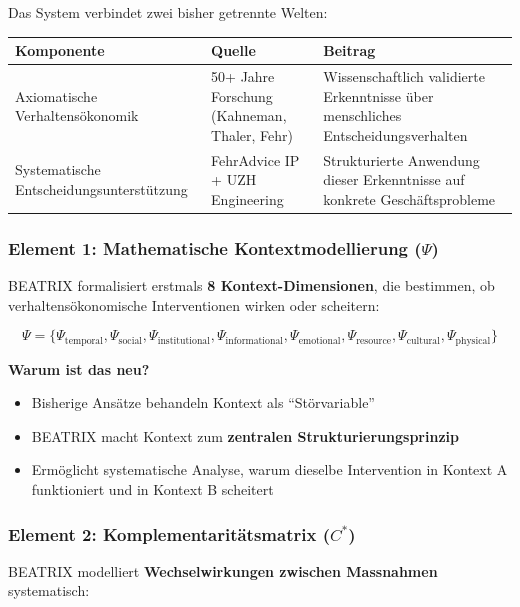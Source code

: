 \documentclass[11pt,a4paper]{article}
\begin{document}
Das System verbindet zwei bisher getrennte Welten:

\begin{table}[h]
\centering
\begin{tabularx}{\textwidth}{lXX}
\toprule
\textbf{Komponente} & \textbf{Quelle} & \textbf{Beitrag} \\
\midrule
Axiomatische Verhaltensökonomik & 50+ Jahre Forschung (Kahneman, Thaler, Fehr) & Wissenschaftlich validierte Erkenntnisse über menschliches Entscheidungsverhalten \\
Systematische Entscheidungsunterstützung & FehrAdvice IP + UZH Engineering & Strukturierte Anwendung dieser Erkenntnisse auf konkrete Geschäftsprobleme \\
\bottomrule
\end{tabularx}
\end{table}

\subsubsection{Element 1: Mathematische Kontextmodellierung ($\Psi$)}

BEATRIX formalisiert erstmals \textbf{8 Kontext-Dimensionen}, die bestimmen, ob verhaltensökonomische Interventionen wirken oder scheitern:

\begin{equation}
\Psi = \{\Psi_{\text{temporal}}, \Psi_{\text{social}}, \Psi_{\text{institutional}}, \Psi_{\text{informational}}, \Psi_{\text{emotional}}, \Psi_{\text{resource}}, \Psi_{\text{cultural}}, \Psi_{\text{physical}}\}
\end{equation}

\textbf{Warum ist das neu?}
\begin{itemize}
    \item Bisherige Ansätze behandeln Kontext als ``Störvariable''
    \item BEATRIX macht Kontext zum \textbf{zentralen Strukturierungsprinzip}
    \item Ermöglicht systematische Analyse, warum dieselbe Intervention in Kontext A funktioniert und in Kontext B scheitert
\end{itemize}

\subsubsection{Element 2: Komplementaritätsmatrix ($C^*$)}

BEATRIX modelliert \textbf{Wechselwirkungen zwischen Massnahmen} systematisch:
\end{document}
